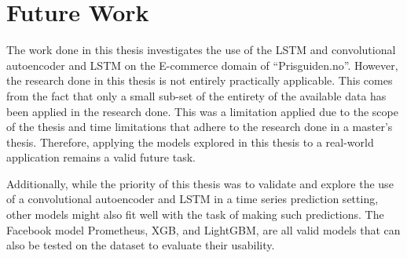 
\section{Future Work}
\label{sections:Discussion:FutureWork}


The work done in this thesis investigates the use of the LSTM and convolutional autoencoder and LSTM
on the E-commerce domain of ``Prisguiden.no''.
However, the research done in this thesis is not entirely practically applicable.
This comes from the fact that only a small sub-set of the entirety of the available data has been applied
in the research done.
This was a limitation applied due to the scope of the thesis and time limitations that adhere to the research done in a master's thesis.
Therefore, applying the models explored in this thesis to a real-world application remains a valid future task.

Additionally, while the priority of this thesis was to validate and explore the use of a convolutional autoencoder and LSTM
in a time series prediction setting, other models might also fit well with the task of making such predictions.
The Facebook model Prometheus, XGB, and LightGBM,
are all valid models that can also be tested on the dataset to evaluate their usability.




